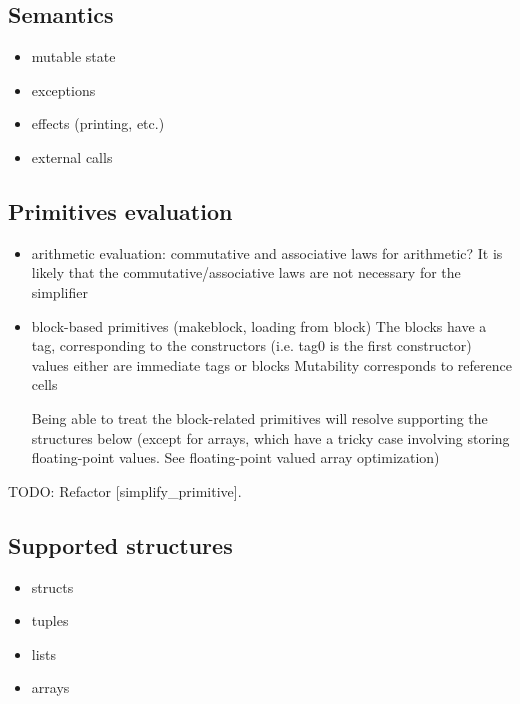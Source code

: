 \documentclass[11pt,fleqn]{amsart}
\begin{document}
\subsection{Semantics}
\begin{itemize}
\item mutable state
\item exceptions
\item effects (printing, etc.)
\item external calls
\end{itemize}

\subsection{Primitives evaluation}
\begin{itemize}
\item arithmetic evaluation: commutative and associative laws for arithmetic?
  It is likely that the commutative/associative laws are not necessary for the simplifier
\item block-based primitives (makeblock, loading from block)
  The blocks have a tag, corresponding to the constructors (i.e. tag0 is the first constructor)
  values either are immediate tags or blocks
  Mutability corresponds to reference cells

  Being able to treat the block-related primitives will resolve supporting the structures below
  (except for arrays, which have a tricky case involving storing floating-point values.
  See floating-point valued array optimization)
\end{itemize}
TODO: Refactor [simplify\_primitive].

\subsection{Supported structures}
\begin{itemize}
\item structs
\item tuples
\item lists
\item arrays
\end{itemize}
\end{document}
